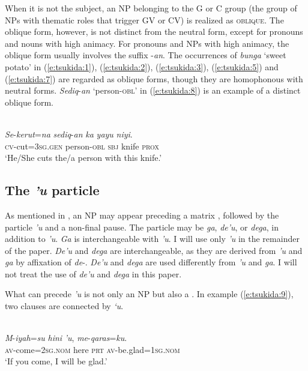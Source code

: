 \documentclass[output=paper
,modfonts
,nonflat]{langsci/langscibook}
\begin{document}
When it is not the subject, an NP belonging to the G or C group (the group of NPs with thematic roles that trigger GV or CV) is realized as \textsc{oblique}. The oblique form, however, is not distinct from the neutral form, except for pronouns and nouns with high animacy. For pronouns and NPs with high animacy, the oblique form usually involves the suffix -\textit{an}. The occurrences of \textit{bunga} ‘sweet potato’ in (\ref{e:tsukida:1}), (\ref{e:tsukida:2}), (\ref{e:tsukida:3}), (\ref{e:tsukida:5}) and (\ref{e:tsukida:7}) are regarded as oblique forms, though they are homophonous with neutral forms. \textit{Sediq}-\textit{an} ‘person-\textsc{obl}’ in (\ref{e:tsukida:8}) is an example of a distinct oblique form.

\begin{exe}
	\label{e:tsukida:8}\\
	\gll \textit{Se}-\textit{kerut}=\textit{na}  \textit{sediq}-\textit{an} \textit{ka} \textit{yayu} \textit{niyi}.\\
	\textsc{cv}-cut=\textsc{3sg.gen} person-\textsc{obl} \textsc{sbj} knife \textsc{prox}\\
	\glt ‘He/She cuts the/a person with this knife.’
\end{exe}

\subsection{\label{s:tsukida:1.4}The \textit{'u} particle}

As mentioned in , an NP may appear preceding a matrix , followed by the particle \textit{'u} and a non-final pause. The particle may be \textit{ga}, \textit{de'u}, or \textit{dega}, in addition to \textit{'u}. \textit{Ga} is interchangeable with \textit{'u}. I will use only \textit{'u} in the remainder of the paper. \textit{De'u} and \textit{dega} are interchangeable, as they are derived from \textit{'u} and \textit{ga} by affixation of \textit{de}-. \textit{De'u} and \textit{dega} are used differently from \textit{'u} and \textit{ga}. I will not treat the use of \textit{de'u} and \textit{dega} in this paper. 

What can precede \textit{'u} is not only an NP but also a . In example (\ref{e:tsukida:9}), two clauses are connected by \textit{‘u}.

\begin{exe}
	\label{e:tsukida:9}\\
	\gll \textit{M}-\textit{iyah}=\textit{su} \textit{hini} \textit{'u}, \textit{me}-\textit{qaras}=\textit{ku}.\\
	\textsc{av}-come=\textsc{2sg.nom} here \textsc{prt}  \textsc{av}-be.glad=\textsc{1sg.nom}\\
	\glt ‘If you come, I will be glad.’
\end{exe}
\end{document}
